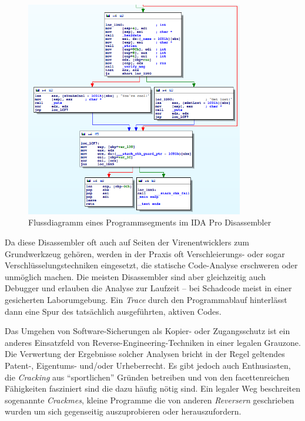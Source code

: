 \begin{figure}[h]
  \begin{center}
    \includegraphics[width=0.85\textwidth]{IDA-pro-flowchart.png}
  \end{center}
  \caption{Flussdiagramm eines Programmsegments im IDA Pro Disassembler}
\end{figure}

Da diese Disassembler oft auch auf Seiten der Virenentwicklers zum Grundwerkzeug gehören, werden in der Praxis oft Verschleierungs- oder sogar Verschlüsselungstechniken eingesetzt, die statische Code-Analyse erschweren oder unmöglich machen. Die meisten Disassembler sind aber gleichzeitig auch Debugger und erlauben die Analyse zur Laufzeit – bei Schadcode meist in einer gesicherten Laborumgebung. Ein \emph{Trace} durch den Programmablauf hinterlässt dann eine Spur des tatsächlich ausgeführten, aktiven Codes.

Das Umgehen von Software-Sicherungen als Kopier- oder Zugangsschutz ist ein anderes Einsatzfeld von Reverse-Engineering-Techniken in einer legalen Grauzone. Die Verwertung  der Ergebnisse solcher Analysen bricht in der Regel geltendes Patent-, Eigentums- und/oder Urheberrecht. Es gibt jedoch auch Enthusiasten, die \emph{Cracking} aus ``sportlichen'' Gründen betreiben und von den facettenreichen Fähigkeiten fasziniert sind die dazu häufig nötig sind. Ein legaler Weg beschreiten sogenannte \emph{Crackmes}\cite{crackme}, kleine Programme die von anderen \emph{Reversern} geschrieben wurden um sich gegenseitig auszuprobieren oder herauszufordern.

